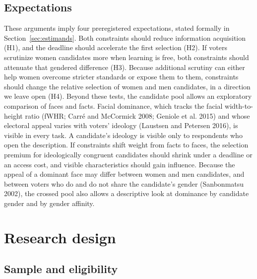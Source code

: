 \documentclass[11pt]{article}\usepackage[]{graphicx}\usepackage[]{xcolor}
\begin{document}
\subsection{Expectations}

These arguments imply four preregistered expectations, stated formally in Section~\ref{sec:estimands}. Both constraints should reduce information acquisition (H1), and the deadline should accelerate the first selection (H2). If voters scrutinize women candidates more when learning is free, both constraints should attenuate that gendered difference (H3). Because additional scrutiny can either help women overcome stricter standards or expose them to them, constraints should change the relative selection of women and men candidates, in a direction we leave open (H4). Beyond these tests, the candidate pool allows an exploratory comparison of faces and facts. Facial dominance, which tracks the facial width-to-height ratio (fWHR; Carr\'e and McCormick 2008; Geniole et al. 2015) and whose electoral appeal varies with voters' ideology (Laustsen and Petersen 2016), is visible in every task. A candidate's ideology is visible only to respondents who open the description. If constraints shift weight from facts to faces, the selection premium for ideologically congruent candidates should shrink under a deadline or an access cost, and visible characteristics should gain influence. Because the appeal of a dominant face may differ between women and men candidates, and between voters who do and do not share the candidate's gender (Sanbonmatsu 2002), the crossed pool also allows a descriptive look at dominance by candidate gender and by gender affinity.

\section{Research design}
\label{sec:design}

\subsection{Sample and eligibility}
\end{document}
